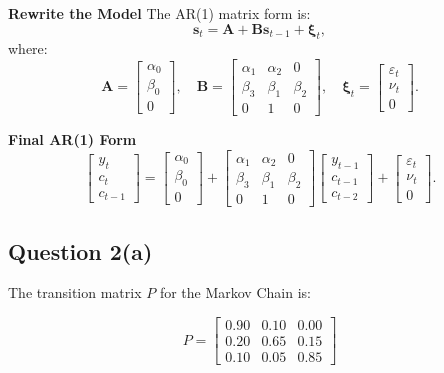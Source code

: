 \documentclass{article}
\begin{document}
\textbf{Rewrite the Model}
The AR(1) matrix form is:
\[
\bm{s}_t = \bm{A} + \bm{B} \bm{s}_{t-1} + \bm{\xi}_t,
\]
where:
\[
\bm{A} = 
\begin{bmatrix}
    \alpha_0 \\ 
    \beta_0 \\ 
    0
\end{bmatrix}, \quad
\bm{B} = 
\begin{bmatrix}
    \alpha_1 & \alpha_2 & 0 \\ 
    \beta_3 & \beta_1 & \beta_2 \\ 
    0 & 1 & 0
\end{bmatrix}, \quad
\bm{\xi}_t = 
\begin{bmatrix}
    \varepsilon_t \\ 
    \nu_t \\ 
    0
\end{bmatrix}.
\]

\textbf{Final AR(1) Form}
\[
\begin{bmatrix}
    y_t \\ 
    c_t \\ 
    c_{t-1}
\end{bmatrix}
=
\begin{bmatrix}
    \alpha_0 \\ 
    \beta_0 \\ 
    0
\end{bmatrix}
+
\begin{bmatrix}
    \alpha_1 & \alpha_2 & 0 \\ 
    \beta_3 & \beta_1 & \beta_2 \\ 
    0 & 1 & 0
\end{bmatrix}
\begin{bmatrix}
    y_{t-1} \\ 
    c_{t-1} \\ 
    c_{t-2}
\end{bmatrix}
+
\begin{bmatrix}
    \varepsilon_t \\ 
    \nu_t \\ 
    0
\end{bmatrix}.
\]

\subsection{Question 2(a)}
The transition matrix $P$ for the Markov Chain is:

\[
P =
\begin{bmatrix}
0.90 & 0.10 & 0.00 \\
0.20 & 0.65 & 0.15 \\
0.10 & 0.05 & 0.85
\end{bmatrix}
\]
\end{document}
